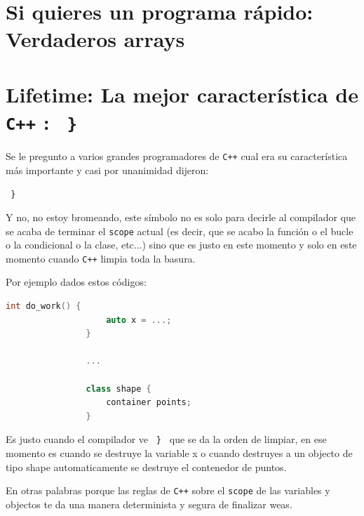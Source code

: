 \documentclass[12pt, fleqn]{report}                             %
\theoremstyle{break}                                            %
\newcommand{\textCode}[1]  { \texttt{#1} }                      %
\newcommand{\Cpp}{\ignorespaces\textCode{C++}}                  %
\begin{document}
        \clearpage
        \section{Si quieres un programa rápido: Verdaderos arrays}  

            
        \clearpage
        \section{Lifetime: La mejor característica de \Cpp: \textCode{ \} } }     
        
            Se le pregunto a varios grandes programadores de \Cpp cual era su
            característica más importante y casi por unanimidad dijeron:

            \textCode{ \} }

            Y no, no estoy bromeando, este símbolo no es solo para decirle al compilador
            que se acaba de terminar el \textCode{scope} actual (es decir, que se acabo 
            la función o el bucle o la condicional o la clase, etc...) sino que es justo
            en este momento y solo en este momento cuando \Cpp limpia toda la basura.

            Por ejemplo dados estos códigos:
            \begin{lstlisting}[language=C++, gobble=16]
                int do_work() {
                    auto x = ...;
                }

                ...

                class shape {
                    container points;
                }
            \end{lstlisting}

            Es justo cuando el compilador ve \textCode{ \} } que se da la orden de limpiar,
            en ese momento es cuando se destruye la variable x o cuando destruyes a un objecto
            de tipo shape automaticamente se destruye el contenedor de puntos.
            
            En otras palabras porque las reglas de \Cpp sobre el \textCode{scope} de las variables
            y objectos te da una manera determinista y segura de finalizar weas.
\end{document}
